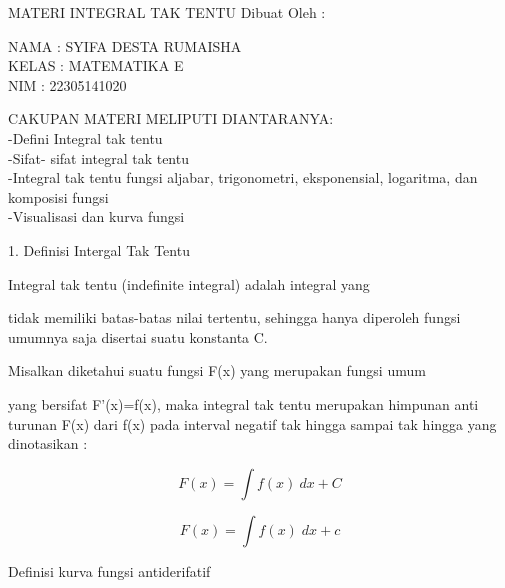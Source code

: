 \documentclass[a4paper,10pt]{article}
\begin{document}
\begin{eulernotebook}
\eulersubheading{}
\begin{eulercomment}
MATERI INTEGRAL TAK TENTU Dibuat Oleh :

NAMA  : SYIFA DESTA RUMAISHA\\
KELAS : MATEMATIKA E\\
NIM   : 22305141020

\end{eulercomment}
\eulersubheading{}
\begin{eulercomment}
CAKUPAN MATERI MELIPUTI DIANTARANYA:\\
-Defini Integral tak tentu\\
-Sifat- sifat integral tak tentu\\
-Integral tak tentu fungsi aljabar, trigonometri, eksponensial,
logaritma, dan komposisi fungsi\\
-Visualisasi dan kurva fungsi

1. Definisi Intergal Tak Tentu

\end{eulercomment}
\begin{eulerttcomment}
    Integral tak tentu (indefinite integral) adalah integral yang
\end{eulerttcomment}
\begin{eulercomment}
tidak memiliki batas-batas nilai tertentu, sehingga hanya diperoleh
fungsi umumnya saja disertai suatu konstanta C.

\end{eulercomment}
\begin{eulerttcomment}
    Misalkan diketahui suatu fungsi F(x) yang merupakan fungsi umum
\end{eulerttcomment}
\begin{eulercomment}
yang bersifat F'(x)=f(x), maka integral tak tentu merupakan himpunan
anti turunan F(x) dari f(x) pada interval negatif tak hingga sampai
tak hingga yang dinotasikan :

\end{eulercomment}
\begin{eulerformula}
\[
 F(x) = \int f(x)\ dx + C
\]
\end{eulerformula}
\begin{eulerformula}
\[
F\left(x\right)=\int {f\left(x\right)}{\;dx}+c
\]
\end{eulerformula}
\begin{eulercomment}
Definisi kurva fungsi antiderifatif


\end{eulercomment}
\end{eulernotebook}
\end{document}

